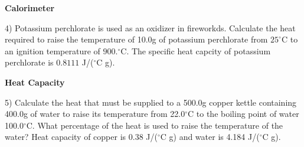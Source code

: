 \documentclass[12pt]{article}
\begin{document}
\textbf{Calorimeter}

4) Potassium perchlorate is used as an oxidizer in fireworkds. Calculate the heat
required to raise the temperature of 10.0g of potassium perchlorate from $25^\circ$C
to an ignition temperature of $900.^\circ$C. The specific heat capcity of potassium
perchlorate is $0.8111$ J/($^\circ$C g).

\textbf{Heat Capacity}

5) Calculate the heat that must be supplied to a 500.0g copper kettle containing 400.0g of
water to raise its temperature from 22.0$^\circ$C to the boiling point of water 100.0$^\circ$C.
What percentage of the heat is used to raise the temperature of the water? Heat capacity of
copper is 0.38 J/($^\circ$C g) and water is 4.184 J/($^\circ$C g).

\end{document}
